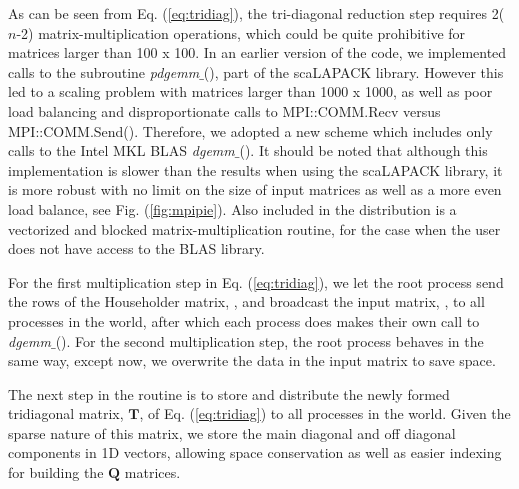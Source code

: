 \documentclass[twocolumn]{article}
\begin{document}
As can be seen from Eq. (\ref{eq:tridiag}), the tri-diagonal reduction step requires 2($n$-2) matrix-multiplication operations, which could be quite prohibitive for matrices larger than 100 x 100.  In an earlier version of the code, we implemented calls to the subroutine \textit{pdgemm}$\_$(), part of the scaLAPACK library\cite{scaLAPACK}.  However this led to a scaling problem with matrices larger than 1000 x 1000, as well as poor load balancing and disproportionate calls to MPI::COMM.Recv versus MPI::COMM.Send().  Therefore, we adopted a new scheme which includes only calls to the Intel MKL BLAS\cite{BLAS}  \textit{dgemm}$\_$().  It should be noted that although this implementation is slower than the results when using the scaLAPACK library, it is more robust with no limit on the size of input matrices as well as a more even load balance, see Fig. (\ref{fig:mpipie}).  Also included in the distribution is a vectorized and blocked matrix-multiplication routine, for the case when the user does not have access to the BLAS library.

For the first multiplication step in Eq. (\ref{eq:tridiag}), we let the root process send the rows of the Householder matrix, \bm{$\Omega$}, and broadcast the input matrix, , to all processes in the world, after which each process does makes their own call to \textit{dgemm}$\_$().  For the second multiplication step, the root process behaves in the same way, except now, we overwrite the data in the input matrix to save space.  

The next step in the routine is to store and distribute the newly formed tridiagonal matrix, $\bm{T}$, of Eq. (\ref{eq:tridiag}) to all processes in the world.  Given the sparse nature of this matrix, we store the main diagonal and off diagonal components in 1D vectors, allowing space conservation as well as easier indexing for building the $\bm{Q}$ matrices. 
\end{document}
